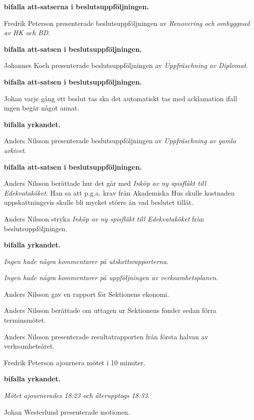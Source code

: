 \documentclass[10pt]{article}
\begin{document}
\begin{paragrafer}
\textbf{\Mba bifalla att-satserna i beslutsuppföljningen.}

Fredrik Peterson presenterade beslutsuppföljningen av \emph{Renovering och ombyggnad av HK och BD}.

\textbf{\Mba bifalla att-satsen i beslutsuppföljningen.}

Johannes Koch presenterade beslutsuppföljningen av \emph{Uppfräschning av Diplomat}.

\textbf{\Mba bifalla att-satsen i beslutsuppföljningen.}

Johan \ypa varje gång ett beslut tas ska det automatiskt tas med acklamation ifall ingen begär något annat.

\textbf{\Mba bifalla yrkandet.}

Anders Nilsson presenterade beslutsuppföljningen av \emph{Uppfräschning av gamla arkivet}.

\textbf{\Mba bifalla att-satsen i beslutsuppföljningen.}

Anders Nilsson berättade hur det går med \emph{Inköp av ny spisfläkt till Edekvataköket}. Han sa att p.g.a. krav från Akademiska Hus skulle kostnaden uppskattningsvis skulle bli mycket större än vad beslutet tillät.

Anders Nilsson \ypa stryka \emph{Inköp av ny spisfläkt till Edekvataköket} från beslutsuppföljningen.

\textbf{\Mba bifalla yrkandet.}

\emph{Ingen hade några kommentarer på utskottsrapporterna.}

\emph{Ingen hade några kommentarer på uppföljningen av verksamhetsplanen.}

Anders Nilsson gav en rapport för Sektionens ekonomi.

Anders Nilsson berättade om uttagen ur Sektionens fonder sedan förra terminsmötet.

Anders Nilsson presenterade resultatrapporten från första halvan av verksamhetsåret.

Fredrik Peterson \ypa ajournera mötet i 10 minuter.

\textbf{\Mba bifalla yrkandet.}

\emph{Mötet ajournerades 18:23 och återupptogs 18:33.}

    \begin{paragrafer}
        Johan Westerlund presenterade motionen.


\end{paragrafer}
\end{paragrafer}
\end{document}
